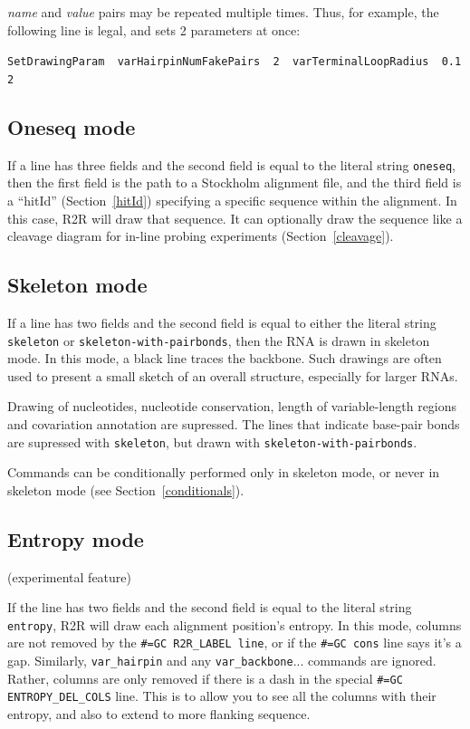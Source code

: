 \documentclass[letterpaper,12pt]{report}
\begin{document}
\textit{name }and \textit{value }pairs may be repeated multiple times. 
Thus, for example, the following line is legal, and sets 2 parameters
at once:

{\tt SetDrawingParam\ \ varHairpinNumFakePairs\ \ 2\ \ varTerminalLoopRadius\ \ 0.12}

\subsection{Oneseq mode}

If a line has three fields and the second field is equal to the literal
string {\tt oneseq}, then the first
field is the path to a Stockholm alignment file, and the third field is
a ``hitId'' (Section~\ref{hitId}) specifying a specific sequence within the alignment.  In this
case, R2R will draw that
sequence.
It can optionally draw the sequence like a cleavage diagram for in-line probing experiments
(Section~\ref{cleavage}).

\subsection{Skeleton mode}
\label{skeleton}

If a line has two fields and the second field is equal to either the literal string
{\tt skeleton} or {\tt skeleton-with-pairbonds}, then the RNA is drawn
in skeleton mode.  In this mode, a black line traces the backbone.  Such
drawings are often used to present a small sketch of an overall structure,
especially for larger RNAs.

Drawing of nucleotides, nucleotide conservation, 
length of variable-length regions and covariation annotation
are supressed.
The lines that indicate base-pair bonds are supressed with {\tt skeleton},
but drawn with {\tt skeleton-with-pairbonds}.

Commands can be conditionally performed only in skeleton mode, or never
in skeleton mode (see Section~\ref{conditionals}).

\subsection{Entropy mode}

(experimental feature)

If the line has two fields and the second field is equal to the literal string
{\tt entropy}, R2R will draw each
alignment position{\textquoteright}s entropy.  In this mode, columns
are not removed by the {\tt \#=GC R2R\_LABEL line}, or if the {\tt \#=GC cons} line says
it's a gap.  Similarly, {\tt var\_hairpin} and any
{\tt var\_backbone}... commands  are ignored.  Rather, columns are only removed
if there is a dash in the special {\tt \#=GC ENTROPY\_DEL\_COLS} line.  This
is to allow you to see all the columns with their entropy, and also to
extend to more flanking sequence.
\end{document}
